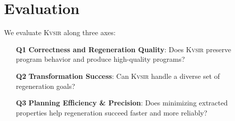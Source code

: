\documentclass[sigplan]{acmart}
\newcommand{\sys}{{\scshape Kv{\textalpha}sir}\xspace}
\newcommand{\heading}[1]{\vspace{2pt}\noindent\textbf{\emph{#1}}:\enspace}
\begin{document}





\section{Evaluation}
\label{sec:evaluation}

We evaluate \sys along three axes:

\begin{itemize}
  \item[\textbf{Q1}] \textbf{Correctness and Regeneration Quality}: Does \sys preserve program behavior and produce high-quality programs?
  \item[\textbf{Q2}] \textbf{Transformation Success}: Can \sys handle a diverse set of regeneration goals?
  \item[\textbf{Q3}] \textbf{Planning Efficiency \& Precision}: Does minimizing extracted properties help regeneration succeed faster and more reliably?
\end{itemize}
\end{document}
